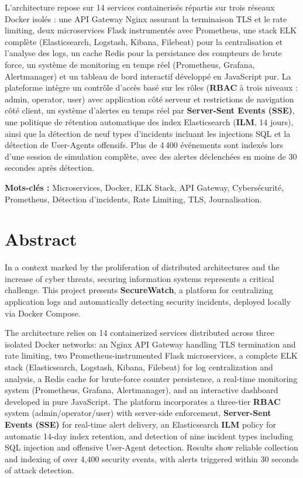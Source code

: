 \documentclass[12pt, a4paper]{report}
\begin{document}
L'architecture repose sur 14 services containerisés répartis sur trois réseaux Docker isolés : une API Gateway Nginx assurant la terminaison TLS et le rate limiting, deux microservices Flask instrumentés avec Prometheus, une stack ELK complète (Elasticsearch, Logstash, Kibana, Filebeat) pour la centralisation et l'analyse des logs, un cache Redis pour la persistance des compteurs de brute force, un système de monitoring en temps réel (Prometheus, Grafana, Alertmanager) et un tableau de bord interactif développé en JavaScript pur. La plateforme intègre un contrôle d'accès basé sur les rôles (\textbf{RBAC} à trois niveaux : admin, operator, user) avec application côté serveur et restrictions de navigation côté client, un système d'alertes en temps réel par \textbf{Server-Sent Events (SSE)}, une politique de rétention automatique des index Elasticsearch (\textbf{ILM}, 14 jours), ainsi que la détection de neuf types d'incidents incluant les injections SQL et la détection de User-Agents offensifs. Plus de 4\,400 événements sont indexés lors d'une session de simulation complète, avec des alertes déclenchées en moins de 30 secondes après détection.

\medskip
\noindent\textbf{Mots-clés :} Microservices, Docker, ELK Stack, API Gateway, Cybersécurité, Prometheus, Détection d'incidents, Rate Limiting, TLS, Journalisation.

\vspace{1.2cm}
\newpage
\section*{Abstract}

In a context marked by the proliferation of distributed architectures and the increase of cyber threats, securing information systems represents a critical challenge. This project presents \textbf{SecureWatch}, a platform for centralizing application logs and automatically detecting security incidents, deployed locally via Docker Compose.

The architecture relies on 14 containerized services distributed across three isolated Docker networks: an Nginx API Gateway handling TLS termination and rate limiting, two Prometheus-instrumented Flask microservices, a complete ELK stack (Elasticsearch, Logstash, Kibana, Filebeat) for log centralization and analysis, a Redis cache for brute-force counter persistence, a real-time monitoring system (Prometheus, Grafana, Alertmanager), and an interactive dashboard developed in pure JavaScript. The platform incorporates a three-tier \textbf{RBAC} system (admin/operator/user) with server-side enforcement, \textbf{Server-Sent Events (SSE)} for real-time alert delivery, an Elasticsearch \textbf{ILM} policy for automatic 14-day index retention, and detection of nine incident types including SQL injection and offensive User-Agent detection. Results show reliable collection and indexing of over 4,400 security events, with alerts triggered within 30 seconds of attack detection.
\end{document}
